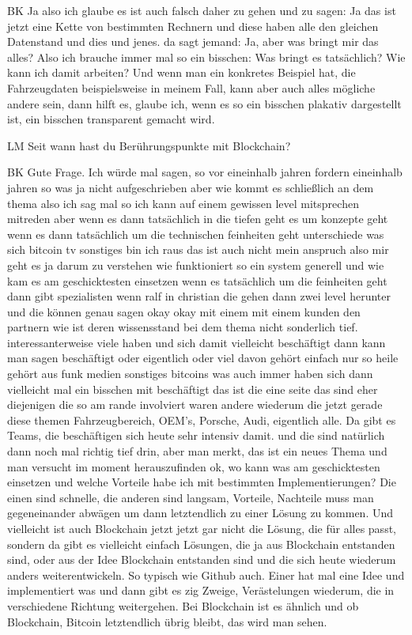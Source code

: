 \begin{xlist}
    \item[BK] Ja also ich glaube es ist auch falsch daher zu gehen und zu sagen: Ja das ist jetzt eine Kette von bestimmten Rechnern und diese haben alle den gleichen Datenstand und dies und jenes. da sagt jemand: Ja, aber was bringt mir das alles? Also ich brauche immer mal so ein bisschen: Was bringt es tatsächlich? Wie kann ich damit arbeiten? Und wenn man ein konkretes Beispiel hat, die Fahrzeugdaten beispielsweise in meinem Fall, kann aber auch alles mögliche andere sein, dann hilft es, glaube ich, wenn es so ein bisschen plakativ dargestellt ist, ein bisschen transparent gemacht wird.
    \item[LM] Seit wann hast du Berührungspunkte mit Blockchain?
    \item[BK] Gute Frage. Ich würde mal sagen, so vor eineinhalb jahren fordern eineinhalb jahren so was ja nicht aufgeschrieben aber wie kommt es schließlich an dem thema also ich sag mal so ich kann auf einem gewissen level mitsprechen mitreden aber wenn es dann tatsächlich in die tiefen geht es um konzepte geht wenn es dann tatsächlich um die technischen feinheiten geht unterschiede was sich bitcoin tv sonstiges bin ich raus das ist auch nicht mein anspruch also mir geht es ja darum zu verstehen wie funktioniert so ein system generell und wie kam es am geschicktesten einsetzen wenn es tatsächlich um die feinheiten geht dann gibt spezialisten wenn ralf in christian die gehen dann zwei level herunter und die können genau sagen okay okay mit einem mit einem kunden den partnern wie ist deren wissensstand bei dem thema nicht sonderlich tief. interessanterweise viele haben und sich damit vielleicht beschäftigt dann kann man sagen beschäftigt oder eigentlich oder viel davon gehört einfach nur so heile gehört aus funk medien sonstiges bitcoins was auch immer haben sich dann vielleicht mal ein bisschen mit beschäftigt das ist die eine seite das sind eher diejenigen die so am rande involviert waren andere wiederum die jetzt gerade diese themen Fahrzeugbereich, OEM's, Porsche, Audi, eigentlich alle. Da gibt es Teams, die beschäftigen sich heute sehr intensiv damit. und die sind natürlich dann noch mal richtig tief drin, aber man merkt, das ist ein neues Thema und man versucht im moment herauszufinden ok, wo kann was am geschicktesten einsetzen und welche Vorteile habe ich mit bestimmten Implementierungen? Die einen sind schnelle, die anderen sind langsam, Vorteile, Nachteile muss man gegeneinander abwägen um dann letztendlich zu einer Lösung zu kommen. Und vielleicht ist auch Blockchain jetzt jetzt gar nicht die Lösung, die für alles passt, sondern da gibt es vielleicht einfach Lösungen, die ja aus Blockchain entstanden sind, oder aus der Idee Blockchain entstanden sind und die sich heute wiederum anders weiterentwickeln. So typisch wie Github auch. Einer hat mal eine Idee und implementiert was und dann gibt es zig Zweige, Verästelungen wiederum, die in verschiedene Richtung weitergehen. Bei Blockchain ist es ähnlich und ob Blockchain, Bitcoin letztendlich übrig bleibt, das wird man sehen.

\end{xlist}
